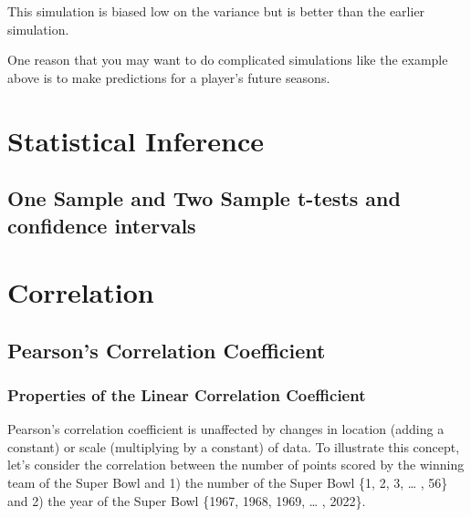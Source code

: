 \documentclass[
  11pt,
]{book}
\theoremstyle{definition}
\theoremstyle{definition}
\theoremstyle{definition}
\theoremstyle{definition}
\theoremstyle{remark}
\begin{document}
This simulation is biased low on the variance but is better than the earlier simulation.

One reason that you may want to do complicated simulations like the example above is to make predictions for a player's future seasons.

\hypertarget{statistical-inference}{%
\chapter{Statistical Inference}\label{statistical-inference}}

\hypertarget{one-sample-and-two-sample-t-tests-and-confidence-intervals}{%
\section{One Sample and Two Sample t-tests and confidence intervals}\label{one-sample-and-two-sample-t-tests-and-confidence-intervals}}

\hypertarget{correlation}{%
\chapter{Correlation}\label{correlation}}

\hypertarget{pearsons-correlation-coefficient}{%
\section{Pearson's Correlation Coefficient}\label{pearsons-correlation-coefficient}}

\hypertarget{properties-of-the-linear-correlation-coefficient}{%
\subsection{Properties of the Linear Correlation Coefficient}\label{properties-of-the-linear-correlation-coefficient}}

Pearson's correlation coefficient is unaffected by changes in location (adding a constant) or scale (multiplying by a constant) of data. To illustrate this concept, let's consider the correlation between the number of points scored by the winning team of the Super Bowl and 1) the number of the Super Bowl \{1, 2, 3, \ldots{} , 56\} and 2) the year of the Super Bowl \{1967, 1968, 1969, \ldots{} , 2022\}.
\end{document}
